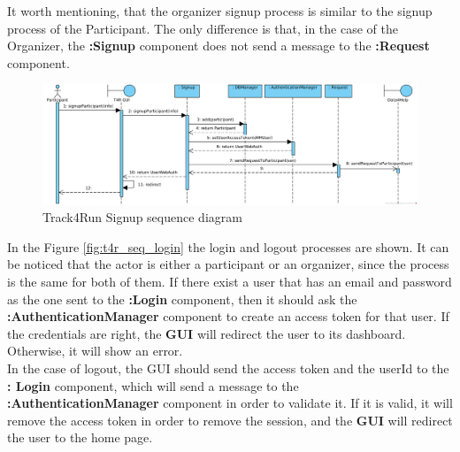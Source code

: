 \documentclass[a4paper, hidelinks, 12pt]{report}
\begin{document}
	It worth mentioning, that the organizer signup process is similar to the signup process of the Participant. The only difference is that, in the case of the Organizer, the \textbf{:Signup} component does not send a message to the \textbf{:Request }component.\\
	
	\begin{figure}[H]
		\centering
		\includegraphics[width=1\textwidth]{diagrams/sequence_diagrams/t4r_signup_participant.png}
		\caption[Track4Run Signup sequence diagram]{Track4Run Signup sequence diagram}
		\label{fig:t4r_seq_signup}
	\end{figure}
	
	In the Figure \ref{fig:t4r_seq_login} the login and logout processes are shown. It can be noticed that the actor is either a participant or an organizer, since the process is the same for both of them. If there exist a user that has an email and password as the one sent to the \textbf{:Login} component, then it should ask the \textbf{:AuthenticationManager} component to create an access token for that user. If the credentials are right, the \textbf{GUI} will redirect the user to its dashboard. Otherwise, it will show an error.\\
	
	In the case of logout, the GUI should send the access token and the userId to the \textbf{: Login} component, which will send a message to the \textbf{:AuthenticationManager} component in order to validate it. If it is valid, it will remove the access token in order to remove the session, and the \textbf{GUI} will redirect the user to the home page.\\ 
	
\end{document}
